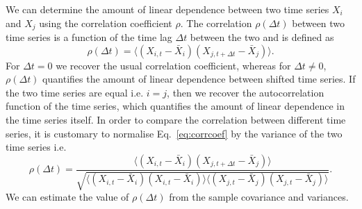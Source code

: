 \documentclass[12pt, a4paper]{article}
\begin{document}
We can determine the amount of linear dependence between two time series $X_{i}$ and $X_{j}$ using the correlation coefficient $\rho$. The correlation $\rho(\Delta t)$ between two time series is a function of the time lag $\Delta t$ between the two and is defined as
\begin{equation}
\rho(\Delta t) = \langle (X_{i, t}-\bar{X}_{i}) (X_{j, t+\Delta t}-\bar{X}_{j}) \rangle. \label{eq:corrcoef}
\end{equation} 
For $\Delta t = 0$ we recover the usual correlation coefficient, whereas for $\Delta t \neq 0$, $\rho(\Delta t)$ quantifies the amount of linear dependence between shifted time series. If the two time series are equal i.e. $i = j$, then we recover the autocorrelation function of the time series, which quantifies the amount of linear dependence in the time series itself. In order to compare the correlation between different time series, it is customary to normalise Eq.~\ref{eq:corrcoef} by the variance of the two time series i.e.
\begin{equation}
\rho(\Delta t) = \frac{\langle (X_{i, t}-\bar{X}_{i}) (X_{j, t+\Delta t}-\bar{X}_{j}) \rangle}{\sqrt{\langle (X_{i, t}-\bar{X}_{i}) (X_{i, t}-\bar{X}_{i}) \rangle \langle (X_{j, t}-\bar{X}_{j}) (X_{j, t}-\bar{X}_{j}) \rangle}}.
\end{equation} 
We can estimate the value of $\rho(\Delta t)$ from the sample covariance and variances.
\end{document}
